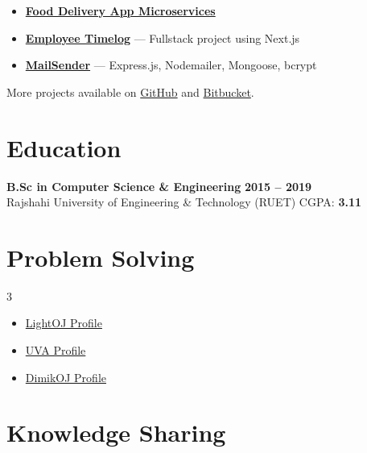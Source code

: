 \documentclass[11pt,a4paper]{article}
\begin{document}
\begin{itemize}[leftmargin=16pt, nosep]
    \item \textbf{\href{https://github.com/aruncse45/food-delivery-microservice}{Food Delivery App Microservices}}
    \item \textbf{\href{https://github.com/aruncse45/clockit-clone}{Employee Timelog}} --- Fullstack project using Next.js
    \item \textbf{\href{https://bitbucket.org/arunruet45/demonodejs}{MailSender}} --- Express.js, Nodemailer, Mongoose, bcrypt
\end{itemize}

\noindent More projects available on \href{https://github.com/aruncse45}{GitHub} and \href{https://bitbucket.org/arunruet45/workspace/repositories/}{Bitbucket}.

\section{Education}

\noindent\textbf{B.Sc in Computer Science \& Engineering} \hfill \textbf{2015 -- 2019} \\
Rajshahi University of Engineering \& Technology (RUET) \hfill CGPA: \textbf{3.11}

\section{Problem Solving}
\begin{multicols}{3}
\begin{itemize}[leftmargin=16pt, nosep]
    \item \href{https://lightoj.com/user/arunaka837}{LightOJ Profile}
    \item \href{https://uhunt.onlinejudge.org/id/737005}{UVA Profile}
    \item \href{https://dimikoj.com/profile/2692?ak47}{DimikOJ Profile}
\end{itemize}
\end{multicols}

\section{Knowledge Sharing}
\end{document}
